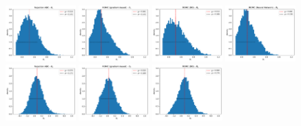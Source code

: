 \documentclass[article, shortnames]{jss}
\begin{document}
\begin{figure}[ht]
  \begin{center}
    \includegraphics[width=0.24\textwidth]{./Figures/chapter4/mae2_hist_t1_rejection.pdf}
    \includegraphics[width=0.24\textwidth]{./Figures/chapter4/mae2_hist_t1_romc.pdf}
    \includegraphics[width=0.24\textwidth]{./Figures/chapter4/mae2_hist_t1_romc_bo.pdf}
    \includegraphics[width=0.24\textwidth]{./Figures/chapter4/mae2_hist_t1_romc_nn.pdf}\\
    \includegraphics[width=0.24\textwidth]{./Figures/chapter4/mae2_hist_t2_rejection.pdf}
    \includegraphics[width=0.24\textwidth]{./Figures/chapter4/mae2_hist_t2_romc.pdf}
    \includegraphics[width=0.24\textwidth]{./Figures/chapter4/mae2_hist_t2_romc_bo.pdf}

\end{center}
\end{figure}
\end{document}
